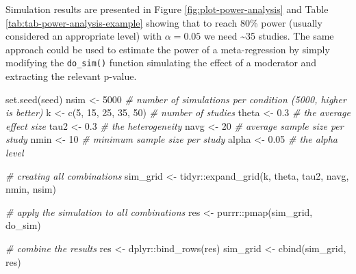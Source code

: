 \documentclass[
  man,floatsintext]{apa6}
\newenvironment{Shaded}{\begin{snugshade}}{\end{snugshade}}
\newcommand{\CommentTok}[1]{\textcolor[rgb]{0.56,0.35,0.01}{\textit{#1}}}
\newcommand{\DecValTok}[1]{\textcolor[rgb]{0.00,0.00,0.81}{#1}}
\newcommand{\FloatTok}[1]{\textcolor[rgb]{0.00,0.00,0.81}{#1}}
\newcommand{\FunctionTok}[1]{\textcolor[rgb]{0.00,0.00,0.00}{#1}}
\newcommand{\NormalTok}[1]{#1}
\newcommand{\OtherTok}[1]{\textcolor[rgb]{0.56,0.35,0.01}{#1}}
\newcommand{\SpecialCharTok}[1]{\textcolor[rgb]{0.00,0.00,0.00}{#1}}
\begin{document}
\normalsize

Simulation results are presented in Figure \ref{fig:plot-power-analysis} and Table \ref{tab:tab-power-analysis-example} showing that to reach 80\% power (usually considered an appropriate level) with \(\alpha = 0.05\) we need \textasciitilde35 studies. The same approach could be used to estimate the power of a meta-regression by simply modifying the \texttt{do\_sim()} function simulating the effect of a moderator and extracting the relevant p-value.

\scriptsize

\begin{Shaded}
\begin{Highlighting}[]
\FunctionTok{set.seed}\NormalTok{(seed)}
\NormalTok{nsim }\OtherTok{\textless{}{-}} \DecValTok{5000} \CommentTok{\# number of simulations per condition (5000, higher is better)}
\NormalTok{k }\OtherTok{\textless{}{-}} \FunctionTok{c}\NormalTok{(}\DecValTok{5}\NormalTok{, }\DecValTok{15}\NormalTok{, }\DecValTok{25}\NormalTok{, }\DecValTok{35}\NormalTok{, }\DecValTok{50}\NormalTok{) }\CommentTok{\# number of studies}
\NormalTok{theta }\OtherTok{\textless{}{-}} \FloatTok{0.3} \CommentTok{\# the average effect size}
\NormalTok{tau2 }\OtherTok{\textless{}{-}} \FloatTok{0.3} \CommentTok{\# the heterogeneity}
\NormalTok{navg }\OtherTok{\textless{}{-}} \DecValTok{20} \CommentTok{\# average sample size per study}
\NormalTok{nmin }\OtherTok{\textless{}{-}} \DecValTok{10} \CommentTok{\# minimum sample size per study}
\NormalTok{alpha }\OtherTok{\textless{}{-}} \FloatTok{0.05} \CommentTok{\# the alpha level}

\CommentTok{\# creating all combinations}
\NormalTok{sim\_grid }\OtherTok{\textless{}{-}}\NormalTok{ tidyr}\SpecialCharTok{::}\FunctionTok{expand\_grid}\NormalTok{(k, theta, tau2, navg, nmin, nsim)}

\CommentTok{\# apply the simulation to all combinations}
\NormalTok{res }\OtherTok{\textless{}{-}}\NormalTok{ purrr}\SpecialCharTok{::}\FunctionTok{pmap}\NormalTok{(sim\_grid, do\_sim)}

\CommentTok{\# combine the results}
\NormalTok{res }\OtherTok{\textless{}{-}}\NormalTok{ dplyr}\SpecialCharTok{::}\FunctionTok{bind\_rows}\NormalTok{(res)}
\NormalTok{sim\_grid }\OtherTok{\textless{}{-}} \FunctionTok{cbind}\NormalTok{(sim\_grid, res)}
\end{Highlighting}
\end{Shaded}

\normalsize

\scriptsize
\end{document}
